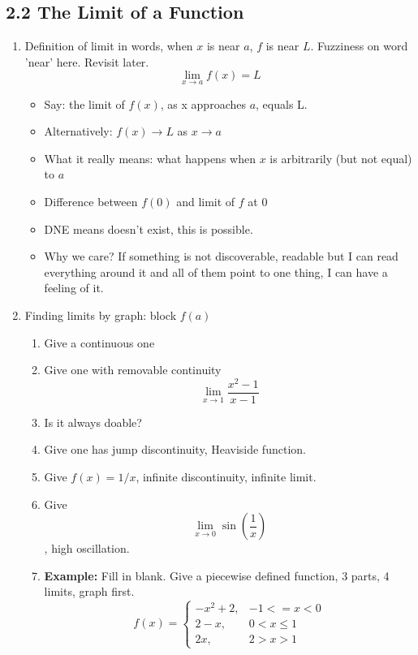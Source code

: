 \documentclass{article}
\begin{document}
\subsection{2.2 The Limit of a Function}
\begin{enumerate}

\item Definition of limit in words, when $x$ is near $a$, $f$ is near $L$. Fuzziness on word 'near' here. Revisit later.
$$
\lim_{x\rightarrow a} f(x) = L
$$
\begin{itemize}
\item Say: the limit of $f(x)$, as x approaches $a$, equals L. 
\item Alternatively: $f(x)\rightarrow L$ as $x\rightarrow a$\\
\item What it really means: what happens when $x$ is arbitrarily (but not equal) to $a$\\
\item Difference between $f(0)$ and limit of $f$ at $0$\\
\item DNE means doesn't exist, this is possible.
\item Why we care?  If something is not discoverable, readable but I can read everything around it and all of them point to one thing, I can have a feeling of it. 
\end{itemize}

\item Finding limits by graph: block $f(a)$
\begin{enumerate}
\item Give a continuous one
\item Give one with removable continuity
$$\lim_{x\rightarrow 1}\frac{x^2-1}{x-1}$$
\item Is it always doable?
\item Give one has jump discontinuity, Heaviside function.
\item Give $f(x)=1/x$, infinite discontinuity, infinite limit.
\item Give $$\lim_{x\rightarrow 0}\sin (\frac{1}{x})$$, high oscillation.
\item {\bf Example:} Fill in blank. Give a piecewise defined function, 3 parts, 4 limits, graph  first.
\[
f(x) = \begin{cases}
-x^2+2 , & -1 <= x < 0 \\
2-x, & 0<x\leq 1 \\
2x, & 2>x>1
\end {cases}
\]
\end{enumerate}


\end{enumerate}
\end{document}
